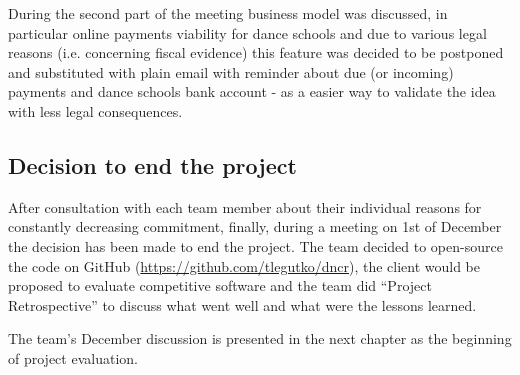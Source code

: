 \documentclass{article}
\begin{document}
During the second part of the meeting business model was discussed, in particular online payments viability for dance schools and due to various legal reasons (i.e. concerning fiscal evidence) this feature was decided to be postponed and substituted with plain email with reminder about due (or incoming) payments and dance schools bank account - as a easier way to validate the idea with less legal consequences.



\subsection{Decision to end the project}
After consultation with each team member about their individual reasons for constantly decreasing commitment, finally, during a meeting on 1st of December the decision has been made to end the project. The team decided to open-source the code on GitHub (\url{https://github.com/tlegutko/dncr}), the client would be proposed to evaluate competitive software and the team did ``Project Retrospective'' to discuss what went well and what were the lessons learned.

The team's December discussion is presented in the next chapter as the beginning of project evaluation.

\newpage
\end{document}
